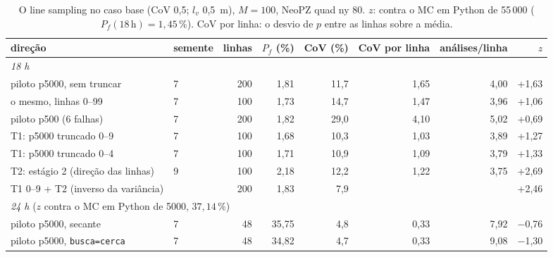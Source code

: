 \begin{table}[htbp]\centering\footnotesize\setlength{\tabcolsep}{4pt}
\caption{O line sampling no caso base (CoV 0,5; $l_v$ 0,5~m), $M = 100$, NeoPZ quad ny 80. $z$: contra o MC em Python de 55\,000 ($P_f(18\,\mathrm{h}) = 1{,}45\,\%$). CoV por linha: o desvio de $p$ entre as linhas sobre a média.}\label{tab:ls}
\begin{tabular}{llrrrrrr}\toprule
direção & semente & linhas & $P_f$ (\%) & CoV (\%) & CoV por linha & análises/linha & $z$ \\\midrule
\multicolumn{8}{l}{\emph{18 h}} \\
piloto p5000, sem truncar & 7 & 200 & 1{,}81 & 11{,}7 & 1{,}65 & 4{,}00 & +1{,}63 \\
o mesmo, linhas 0--99 & 7 & 100 & 1{,}73 & 14{,}7 & 1{,}47 & 3{,}96 & +1{,}06 \\
piloto p500 (6 falhas) & 7 & 200 & 1{,}82 & 29{,}0 & 4{,}10 & 5{,}02 & +0{,}69 \\
T1: p5000 truncado 0--9 & 7 & 100 & 1{,}68 & 10{,}3 & 1{,}03 & 3{,}89 & +1{,}27 \\
T1: p5000 truncado 0--4 & 7 & 100 & 1{,}71 & 10{,}9 & 1{,}09 & 3{,}79 & +1{,}33 \\
T2: estágio 2 (direção das linhas) & 9 & 100 & 2{,}18 & 12{,}2 & 1{,}22 & 3{,}75 & +2{,}69 \\
T1 0--9 + T2 (inverso da variância) & & 200 & 1{,}83 & 7{,}9 & & & +2{,}46 \\
\multicolumn{8}{l}{\emph{24 h} ($z$ contra o MC em Python de 5000, $37{,}14\,\%$)} \\
piloto p5000, secante & 7 & 48 & 35{,}75 & 4{,}8 & 0{,}33 & 7{,}92 & \ensuremath{-}0{,}76 \\
piloto p5000, \texttt{busca=cerca} & 7 & 48 & 34{,}82 & 4{,}7 & 0{,}33 & 9{,}08 & \ensuremath{-}1{,}30 \\
\bottomrule\end{tabular}\end{table}
